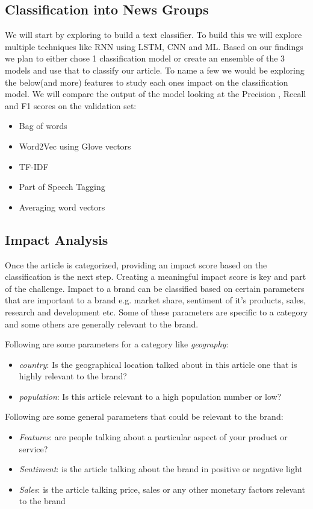 \documentclass{article}
\begin{document}
\subsection*{Classification into News Groups}

We will start by exploring to build a text classifier. To build this we will explore multiple techniques like RNN using LSTM, CNN and ML. Based on our findings we plan to either chose 1 classification model or create an ensemble of the 3 models and use that to classify our article. To name a few we would be exploring the below(and more) features to study each ones impact on the classification model. We will compare the output of the model looking at the  Precision , Recall and F1 scores on the validation set: 
	
\begin{itemize}
	\item Bag of words 
	\item Word2Vec using Glove vectors
	\item TF-IDF
	\item Part of Speech Tagging
	\item Averaging word vectors 
\end{itemize}

\subsection*{Impact Analysis}
Once the article is categorized, providing an impact score based on the classification is the next step. Creating a meaningful impact score is key and part of the challenge. Impact to a brand can be classified based on certain parameters that are important to a brand e.g. market share, sentiment of it's products, sales, research and development etc. Some of these parameters are specific to a category and some others are generally relevant to the brand.

Following are some parameters for a category like \textit{geography}:
\begin{itemize}
	\item \textit{country}: Is the geographical location talked about in this article one that is highly relevant to the brand?
	\item \textit{population}: Is this article relevant to a high population number or low?
\end{itemize}

Following are some general parameters that could be relevant to the brand:
\begin{itemize}
	\item \textit{Features}: are people talking about a particular aspect of your product or service?
	\item \textit{Sentiment}: is the article talking about the brand in positive or negative light
	\item \textit{Sales}: is the article talking price, sales or any other monetary factors relevant to the brand
\end{itemize}
\end{document}
